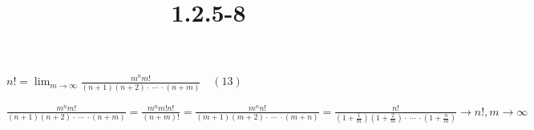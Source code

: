 \documentclass{article}
\title{1.2.5-8}
\begin{document}
\maketitle

$n! = \lim_{m\to\infty} \frac{m^nm!}{(n+1)(n+2) \cdot\ \cdots\ \cdot (n+m)}\quad (13)$

$\frac{m^nm!}{(n+1)(n+2) \cdot\ \cdots\ \cdot (n+m)} = \frac{m^n m! n!}{(n+m)!} = \frac{m^n n!}{(m+1)(m+2) \cdot\ \cdots\ \cdot (m+n)} = \frac{n!}{(1+\frac{1}{m})(1+\frac{2}{m}) \cdot\ \cdots\ \cdot (1+\frac{n}{m})} \to n!, m \to \infty$
\end{document}

